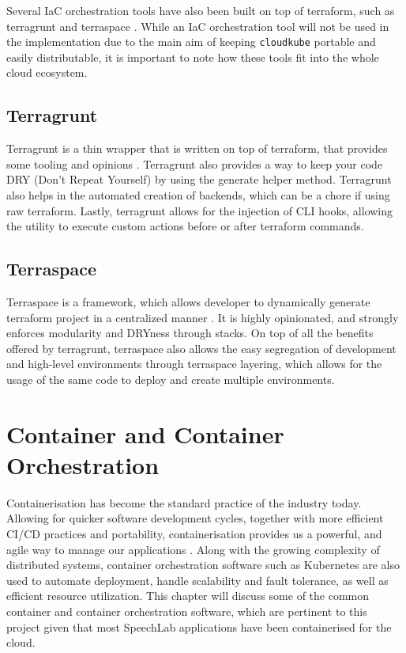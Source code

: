 Several IaC orchestration tools have also been built on top of terraform, such as terragrunt and terraspace \cite{dinu-2025B}. While an IaC orchestration tool will not be used in the implementation due to the main aim of keeping \texttt{cloudkube} portable and easily distributable, it is important to note how these tools fit into the whole cloud ecosystem.

\subsection{Terragrunt}
Terragrunt is a thin wrapper that is written on top of terraform, that provides some tooling and opinions \cite{nguyen-2020}. Terragrunt also provides a way to keep your code DRY (Don't Repeat Yourself) by using the generate helper method. Terragrunt also helps in the automated creation of backends, which can be a chore if using raw terraform. Lastly, terragrunt allows for the injection of CLI hooks, allowing the utility to execute custom actions before or after terraform commands.

\subsection{Terraspace}
Terraspace is a framework, which allows developer to dynamically generate terraform project in a centralized manner \cite{nguyen-no-date}. It is highly opinionated, and strongly enforces modularity and DRYness through stacks. On top of all the benefits offered by terragrunt, terraspace also allows the easy segregation of development and high-level environments through terraspace layering, which allows for the usage of the same code to deploy and create multiple environments. 




\section{Container and Container Orchestration}
Containerisation has become the standard practice of the industry today. Allowing for quicker software development cycles, together with more efficient CI/CD practices and portability, containerisation provides us a powerful, and agile way to manage our applications \cite{rgs-2023}. Along with the growing complexity of distributed systems, container orchestration software such as Kubernetes are also used to automate deployment, handle scalability and fault tolerance, as well as efficient resource utilization.
This chapter will discuss some of the common container and container orchestration software, which are pertinent to this project given that most SpeechLab applications have been containerised for the cloud.

